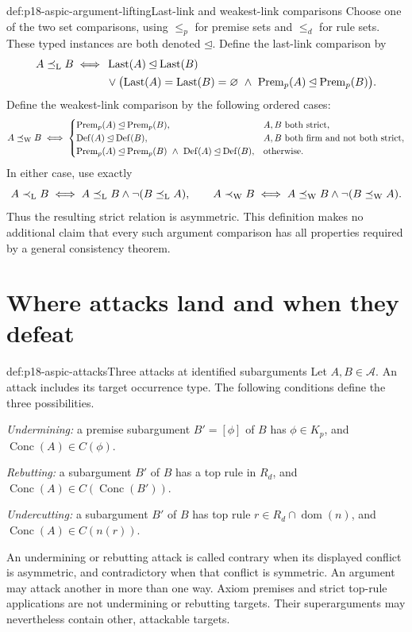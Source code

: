 \begin{hbdefinition}{def:p18-aspic-argument-lifting}{Last-link and weakest-link comparisons}
Choose one of the two set comparisons, using \(\leq_p\) for premise sets
and \(\leq_d\) for rule sets. These typed instances are both denoted
\(\unlhd\).
Define the last-link comparison by
\[
\begin{split}
A\preceq_{\rm L}B\iff{}&
 \operatorname{Last}(A)\unlhd\operatorname{Last}(B)\\
&{}\lor\bigl(
 \operatorname{Last}(A)=\operatorname{Last}(B)=\varnothing
 \ \land\
 \operatorname{Prem}_p(A)\unlhd\operatorname{Prem}_p(B)\bigr).
\end{split}
\]
Define the weakest-link comparison by the following ordered cases:
\[
 A\preceq_{\rm W}B\iff
 \begin{cases}
 \operatorname{Prem}_p(A)\unlhd\operatorname{Prem}_p(B),
       &A,B\text{ both strict},\\
 \operatorname{Def}(A)\unlhd\operatorname{Def}(B),
       &A,B\text{ both firm and not both strict},\\
 \operatorname{Prem}_p(A)\unlhd\operatorname{Prem}_p(B)
   \ \land\ \operatorname{Def}(A)\unlhd\operatorname{Def}(B),
       &\text{otherwise}.
 \end{cases}
\]
In either case, use exactly
\[
 A\prec_{\rm L}B\iff
 A\preceq_{\rm L}B\land\neg(B\preceq_{\rm L}A),
 \qquad
 A\prec_{\rm W}B\iff
 A\preceq_{\rm W}B\land\neg(B\preceq_{\rm W}A).
\]
Thus the resulting strict relation is asymmetric. This definition makes no
additional claim that every such argument comparison has all properties
required by a general consistency theorem.
\end{hbdefinition}

\section{Where attacks land and when they defeat}

\begin{hbdefinition}{def:p18-aspic-attacks}{Three attacks at identified subarguments}
Let \(A,B\in\mathcal A\). An attack includes its target occurrence type.
The following conditions define the three possibilities.

\emph{Undermining:} a premise subargument \(B'=[\phi]\) of \(B\) has
\(\phi\in K_p\), and \(\operatorname{Conc}(A)\in C(\phi)\).

\emph{Rebutting:} a subargument \(B'\) of \(B\) has a top rule in \(R_d\),
and \(\operatorname{Conc}(A)\in C(\operatorname{Conc}(B'))\).

\emph{Undercutting:} a subargument \(B'\) of \(B\) has top rule
\(r\in R_d\cap\operatorname{dom}(n)\), and
\(\operatorname{Conc}(A)\in C(n(r))\).

An undermining or rebutting attack is called contrary when its displayed
conflict is asymmetric, and contradictory when that conflict is symmetric.
An argument may attack another in more than one way. Axiom premises and
strict top-rule applications are not undermining or rebutting targets.
Their superarguments may nevertheless contain other, attackable targets.
\end{hbdefinition}

